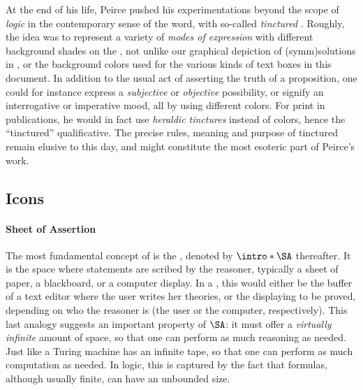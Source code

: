 \begin{scope}
\begin{digression}
At the end of his life, Peirce pushed his experimentations beyond the scope of
\emph{logic} in the contemporary sense of the word, with so-called
\emph{tinctured}  \cite[Chapter~6]{Roberts+1973}.
Roughly, the idea was to represent a variety of \emph{modes of expression} with
different background shades on the , not unlike our
graphical depiction of \emph{} \kl(symm){solutions} in
, or the background colors used for the various kinds of
text boxes in this document. In addition to the usual act of asserting the truth
of a proposition, one could for instance express a \emph{subjective} or
\emph{objective} possibility, or signify an interrogative or imperative mood,
all by using different colors. For print in publications, he would in fact use
\emph{heraldic tinctures} instead of colors, hence the ``tinctured''
qualificative. The precise rules, meaning and purpose of tinctured 
remain elusive to this day, and might constitute the most esoteric part of
Peirce's work.
\end{digression}

\subsection{Icons}

\paragraph{Sheet of Assertion}

\AP The most fundamental concept of  is the , denoted by $\intro*\SA$ thereafter. It is the space where statements
are scribed by the reasoner, typically a sheet of paper, a blackboard, or a
computer display. In a , this would either be the buffer of
a text editor where the user writes her theories, or the 
displaying  to be proved, depending on who the reasoner is (the user
or the computer, respectively). This last analogy suggests an important property
of $\SA$: it must offer a \emph{virtually infinite} amount of space, so that one
can perform as much reasoning as needed. Just like a Turing machine has an
infinite tape, so that one can perform as much computation as needed. In
 logic, this is captured by the fact that formulas, although
usually finite, can have an unbounded size.


\end{scope}
